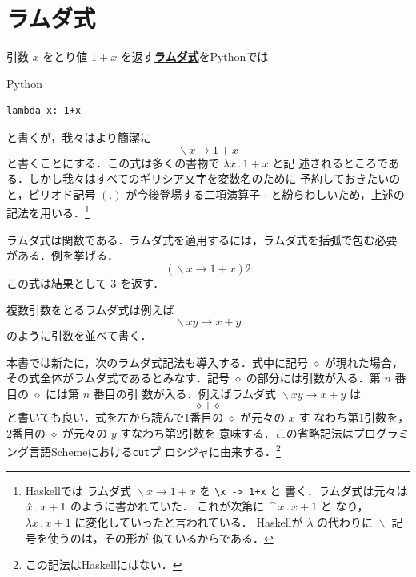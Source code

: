\documentclass[a5paper,twoside,fleqn]{jsbook}
\newcommand{\programminglanguage}[1]{\textsf{#1}}
\newcommand{\haskell}{\programminglanguage{Haskell}}
\newcommand{\python}{\programminglanguage{Python}}
\newcommand{\scheme}{\programminglanguage{Scheme}}
\newcommand{\keyword}[1]{{\underline{\textbf{#1}}}}
\newcommand{\code}[1]{\texttt{#1}}
\newenvironment{pythoncode}{\begin{itembox}[r]{\python}}{\end{itembox}}
\newcommand{\mAnonParam}{\diamond}
\DeclareMathOperator{\mLambda}{\backslash}
\DeclareMathOperator{\mLambdaArrow}{\rightarrow}
\newcommand{\mLambdaExp}[2]{\mLambda{#1}\mLambdaArrow{#2}}
\begin{document}
\section{ラムダ式}

引数 $x$ をとり値 $1+x$ を返す\keyword{ラムダ式}を\python では
\begin{pythoncode}
\begin{verbatim}
lambda x: 1+x
\end{verbatim}
\end{pythoncode}
と書くが，我々はより簡潔に
\begin{equation}
\mLambdaExp{x}{1+x}
\end{equation}
と書くことにする．この式は多くの書物で $\lambda x\mathbin{.}1+x$ と記
述されるところである．しかし我々はすべてのギリシア文字を変数名のために
予約しておきたいのと，ピリオド記号 $(.)$ が今後登場する二項演算子
$\cdot$ と紛らわしいため，上述の記法を用いる．\footnote{\haskell では
  ラムダ式 $\mLambdaExp{x}{1+x}$ を \code{\textbackslash x -> 1+x} と
  書く．ラムダ式は元々は $\Hat x\mathbin{.}x+1$ のように書かれていた．
  これが次第に $\mathop{\texttt{\textasciicircum}}x\mathbin{.}x+1$ と
  なり，$\lambda x\mathbin{.}x+1$ に変化していったと言われている．
  \haskell が $\lambda$ の代わりに $\mLambda$ 記号を使うのは，その形が
  似ているからである．}

ラムダ式は関数である．ラムダ式を適用するには，ラムダ式を括弧で包む必要
がある．例を挙げる．
\begin{equation}
(\mLambdaExp{x}{1+x})2
\end{equation}
この式は結果として $3$ を返す．

複数引数をとるラムダ式は例えば
\begin{equation}
\mLambdaExp{xy}{x+y}
\end{equation}
のように引数を並べて書く．

本書では新たに，次のラムダ式記法も導入する．式中に記号 $\mAnonParam$
が現れた場合，その式全体がラムダ式であるとみなす．記号 $\mAnonParam$
の部分には引数が入る．第 $n$ 番目の $\mAnonParam$ には第 $n$ 番目の引
数が入る．例えばラムダ式 $\mLambdaExp{xy}{x+y}$ は
\begin{equation}
\mAnonParam+\mAnonParam
\end{equation}
と書いても良い．式を左から読んで1番目の $\mAnonParam$ が元々の $x$ す
なわち第1引数を，2番目の $\mAnonParam$ が元々の $y$ すなわち第2引数を
意味する．この省略記法はプログラミング言語\scheme における\code{cut}プ
ロシジャに由来する．\footnote{この記法は\haskell にはない．}
\end{document}
